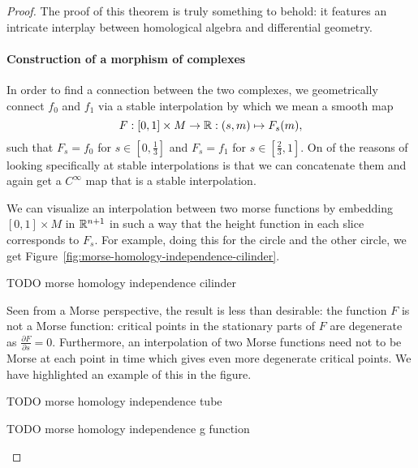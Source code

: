 \begin{proof}
The proof of this theorem is truly something to behold: it features an intricate interplay between homological algebra and differential geometry.
\paragraph{Construction of a morphism of complexes}
In order to find a connection between the two complexes, we geometrically connect $f_0$ and $f_1$ via a stable interpolation by which we mean a smooth map
\[
    F: [0,1] \times M \to \mathbb{R}: (s, m) \mapsto F_s(m)
,\] 
such that $F_s = f_0$ for $s \in \left[0, \frac{1}{3}\right]$ and $F_s = f_1$ for $s \in \left[\frac{2}{3}, 1\right]$.
On of the reasons of looking specifically at stable interpolations is that we can concatenate them and again get a $C^{\infty}$ map that is a stable interpolation.

We can visualize an interpolation between two morse functions by embedding $[0,1] \times M$ in $\mathbb{R}^{n+1}$ in such a way that the height function in each slice corresponds to $F_s$.
For example, doing this for the circle and the other circle, we get Figure~\ref{fig:morse-homology-independence-cilinder}.

\begin{marginfigure}
    \centering
    \caption{TODO morse homology independence cilinder}
    \label{fig:morse-homology-independence-cilinder}
\end{marginfigure}

Seen from a Morse perspective, the result is less than desirable: the function $F$ is not a Morse function: critical points in the stationary parts of $F$ are degenerate as $\frac{\partial F}{\partial s} = 0$.
Furthermore, an interpolation of two Morse functions need not to be Morse at each point in time which gives even more degenerate critical points. We have highlighted an example of this in the figure.

\begin{marginfigure}
    \centering
    \caption{TODO morse homology independence tube}
    \label{fig:morse-homology-independence-tube}
\end{marginfigure}

\begin{marginfigure}
    \centering
    \caption{TODO morse homology independence g function}
    \label{fig:morse-homology-independence-g-function}
\end{marginfigure}


\end{proof}
